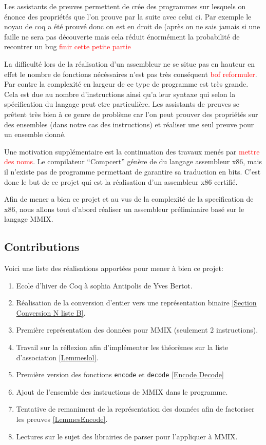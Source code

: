 \documentclass {article}
\theoremstyle{definition}
\theoremstyle{remark}
\newcommand{\todo}[1]{\textcolor{red}{#1}}
\newcommand{\fun}[1]{\lstinline!#1!}
\begin{document}
Les assistants de preuves permettent de crée des programmes sur lesquels on énonce des propriétés que l'on prouve par
la suite avec celui ci. 
Par exemple le noyau de coq a été prouvé donc on est en droit de (après on ne sais jamais si une faille ne sera pas découverte
mais cela réduit énormément la probabilité de recontrer un bug \todo{finir cette petite partie}

La difficulté lors de la réalisation d'un assembleur ne se situe pas en hauteur en effet le nombre de
fonctions nécéssaires n'est pas très conséquent \todo{bof reformuler}. Par contre la complexité en largeur
de ce type de programme est très grande. Cela est due au nombre d'instructions ainsi qu'a leur syntaxe qui selon
la spécification du langage peut etre particulière.
Les assistants de preuves se prêtent très bien à ce genre de problème car l'on peut prouver des
propriétés sur des ensembles (dans notre cas des instructions) et réaliser une seul preuve pour
un ensemble donné.

Une motivation supplémentaire est la continuation des travaux menés par \todo{mettre des noms}.
Le compilateur ``Compcert'' génère de du langage assembleur x86, mais il n'existe pas
de programme permettant de garantire sa traduction en bits.
C'est donc le but de ce projet qui est la réalisation d'un assembleur x86 certifié.

Afin de mener a bien ce projet et au vus de la complexité de la specification de x86,
nous allons tout d'abord réaliser un assembleur préliminaire basé sur le langage MMIX.



\subsection{Contributions}
Voici une liste des réalisations apportées pour mener à bien ce projet:
\begin{enumerate}
\item Ecole d'hiver de Coq à sophia Antipolis de Yves Bertot.
\item Réalisation de la conversion d'entier vers une représentation binaire \ref{Section Conversion N liste B}.
\item Première représentation des données pour MMIX (seulement 2 instructions).
\item Travail sur la réflexion afin d'implémenter les théorèmes sur la liste d'association \ref{Lemmeslol}.
\item Première version des fonctions \fun{encode} et \fun{decode} \ref{Encode Decode}
\item Ajout de l'ensemble des instructions de MMIX dans le programme.
\item Tentative de remaniment de la représentation des données afin de factoriser les preuves \ref{LemmesEncode}.
\item Lectures sur le sujet des librairies de parser pour l'appliquer à MMIX.
\end{enumerate}
\end{document}
